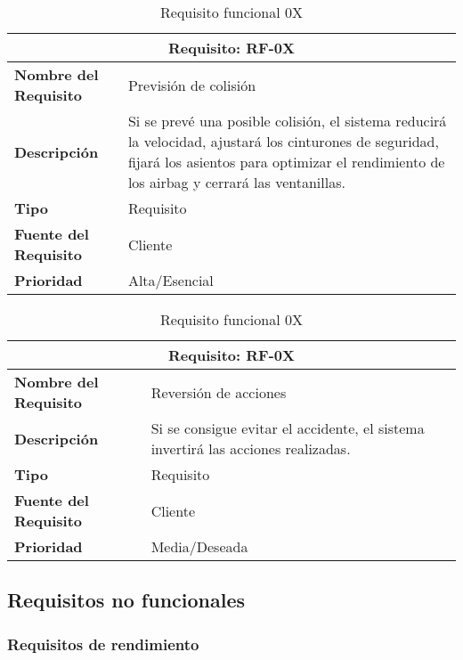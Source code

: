 \begin{table}[H]
\begin{center}
\begin{tabular}{p{} p{7cm}}
\multicolumn{2}{c}{\textbf{Requisito: RF-0X} } \\
\hline \hline
\textbf{Nombre del Requisito} & Previsión de colisión\\
\hline
\textbf{Descripción} &  Si se prevé una posible colisión, el sistema reducirá la velocidad, ajustará los cinturones de seguridad, fijará los asientos para optimizar el rendimiento de los airbag y cerrará las ventanillas.\\
\hline
\textbf{Tipo} & Requisito  \\
\hline
\textbf{Fuente del Requisito} & Cliente  \\
\hline
\textbf{Prioridad} & Alta/Esencial \\ \hline
\end{tabular}
\caption{Requisito funcional 0X}
\label{tab:personal}
\end{center}
\end{table}

\begin{table}[H]
\begin{center}
\begin{tabular}{p{} p{7cm}}
\multicolumn{2}{c}{\textbf{Requisito: RF-0X} } \\
\hline \hline
\textbf{Nombre del Requisito} & Reversión de acciones\\
\hline
\textbf{Descripción} &  Si se consigue evitar el accidente, el sistema invertirá las acciones realizadas.\\
\hline
\textbf{Tipo} & Requisito  \\
\hline
\textbf{Fuente del Requisito} & Cliente  \\
\hline
\textbf{Prioridad} & Media/Deseada \\ \hline
\end{tabular}
\caption{Requisito funcional 0X}
\label{tab:personal}
\end{center}
\end{table}


\subsection{Requisitos no funcionales}

\subsubsection{Requisitos de rendimiento}

